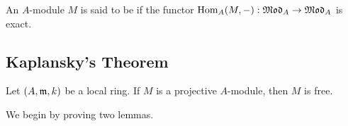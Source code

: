 \begin{definition}
    An $A$-module $M$ is said to be  if the functor $\operatorname{Hom}_A(M,-):\mathfrak{Mod}_A\to\mathfrak{Mod}_A$ is exact.
\end{definition}

\subsection{Kaplansky's Theorem}

\begin{theorem}
    Let $(A,\mathfrak{m},k)$ be a local ring. If $M$ is a projective $A$-module, then $M$ is free.
\end{theorem}

We begin by proving two lemmas. 

